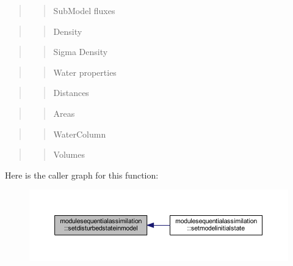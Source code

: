 \begin{quote}
\begin{quote}
Sub\+Model fluxes \end{quote}
\end{quote}


\begin{quote}
\begin{quote}
Density \end{quote}
\end{quote}


\begin{quote}
\begin{quote}
Sigma Density \end{quote}
\end{quote}


\begin{quote}
\begin{quote}
Water properties \end{quote}
\end{quote}


\begin{quote}
\begin{quote}
Distances \end{quote}
\end{quote}


\begin{quote}
\begin{quote}
Areas \end{quote}
\end{quote}


\begin{quote}
\begin{quote}
Water\+Column \end{quote}
\end{quote}


\begin{quote}
\begin{quote}
Volumes \end{quote}
\end{quote}
Here is the caller graph for this function\+:\nopagebreak
\begin{figure}[H]
\begin{center}
\leavevmode
\includegraphics[width=350pt]{namespacemodulesequentialassimilation_a063e8f5d94cc80db103c79a0ec38a127_icgraph}
\end{center}
\end{figure}
\mbox{\label{namespacemodulesequentialassimilation_a0b54df1b07a9718187dcc6448f23026c}} 
